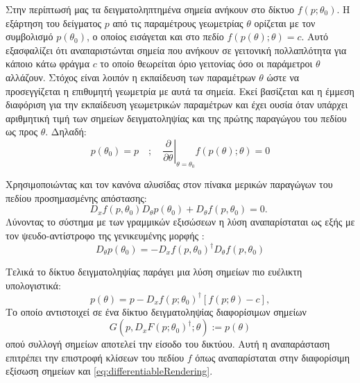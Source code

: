     Στην περίπτωσή μας τα  δειγματοληπτημένα σημεία ανήκουν στο δίκτυο $f(p;\theta_0)$. Η εξάρτηση του δείγματος $p$ από τις παραμέτρους γεωμετρίας $\theta$ ορίζεται με τον συμβολισμό \(p(\theta_0)\), ο οποίος εισάγεται και στο πεδίο $f(p(\theta);\theta)=c$. Αυτό εξασφαλίζει ότι αναπαριστώνται σημεία που ανήκουν σε γειτονική πολλαπλότητα για κάποιο κάτω φράγμα $c$ το οποίο θεωρείται όριο γειτονίας όσο οι παράμετροι $\theta$ αλλάζουν. Στόχος είναι λοιπόν η εκπαίδευση των παραμέτρων $\theta$ ώστε να προσεγγίζεται η  επιθυμητή γεωμετρία με αυτά τα σημεία. Εκεί βασίζεται και η έμμεση διαφόριση για την εκπαίδευση γεωμετρικών παραμέτρων και έχει ουσία όταν υπάρχει αριθμητική τιμή των σημείων δειγματοληψίας και της πρώτης παραγώγου του πεδίου ως προς 
    $\theta$. Δηλαδή:
    \begin{equation}
        p\left(\theta_0\right)=p \quad ;\left.\quad \frac{\partial}{\partial \theta}\right|_{\theta=\theta_0} f(p(\theta) ; \theta)=0
    \end{equation}

    Χρησιμοποιώντας και τον κανόνα αλυσίδας στον πίνακα μερικών παραγώγων του πεδίου προσημασμένης απόστασης:
    \begin{equation}
        D_x f\left(p, \theta_0\right) D_\theta p\left(\theta_0\right)+D_\theta f\left(p, \theta_0\right)=0 \text {. }
    \end{equation}
    Λύνοντας το σύστημα με των γραμμικών εξισώσεων η λύση αναπαρίσταται ως εξής με τον ψευδο-αντίστροφο της γενικευμένης μορφής :
    \begin{equation}
        D_\theta p\left(\theta_0\right)=-D_x f\left(p, \theta_0\right)^{\dagger} D_\theta f\left(p, \theta_0\right)
    \end{equation}

    Τελικά το δίκτυο δειγματοληψίας παράγει μια λύση σημείων πιο ευέλικτη υπολογιστικά: 
    \begin{equation}
        p(\theta)=p-D_x f\left(p ; \theta_0\right)^{\dagger}[f(p ; \theta)-c],     \end{equation}
    Το οποίο αντιστοιχεί σε ένα δίκτυο δειγματοληψίας διαφορίσιμων σημείων 
    \begin{equation}
        G\left(p, D_x F\left(p ; \theta_0\right)^{\dagger} ; \theta\right):=p(\theta)
    \end{equation}
    οπού συλλογή σημείων αποτελεί την είσοδο του δικτύου. Αυτή η αναπαράσταση επιτρέπει την επιστροφή κλίσεων του πεδίου $f$ όπως αναπαρίσταται στην διαφορίσιμη εξίσωση σημείων και \ref{eq:differentiableRendering}.
    
